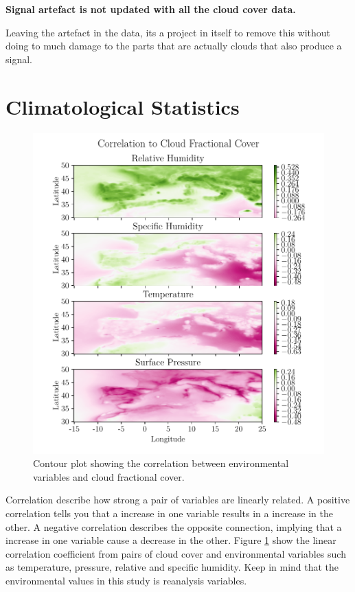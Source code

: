 \textbf{Signal artefact is not updated with all the cloud cover data.}

Leaving the artefact in the data, its a project in itself to remove this without doing to much damage to the parts that are actually clouds that also produce a signal.

\section{Climatological Statistics}
\begin{figure}[ht]
    \centering
    \includegraphics{python_figs/correlation_figure.pdf}
    \caption{Contour plot showing the correlation between environmental variables and cloud fractional cover. }
    \label{fig:correlation_tcc_vs_envio}
\end{figure}
Correlation describe how strong a pair of variables are linearly related. A positive correlation tells you that a increase in one variable results in a increase in the other. A negative correlation describes the opposite connection, implying that a increase in one variable cause a decrease in the other. Figure \ref{fig:correlation_tcc_vs_envio} show the linear correlation coefficient from pairs of cloud cover and environmental variables such as temperature, pressure, relative and specific humidity.
Keep in mind that the environmental values in this study is reanalysis variables. 

